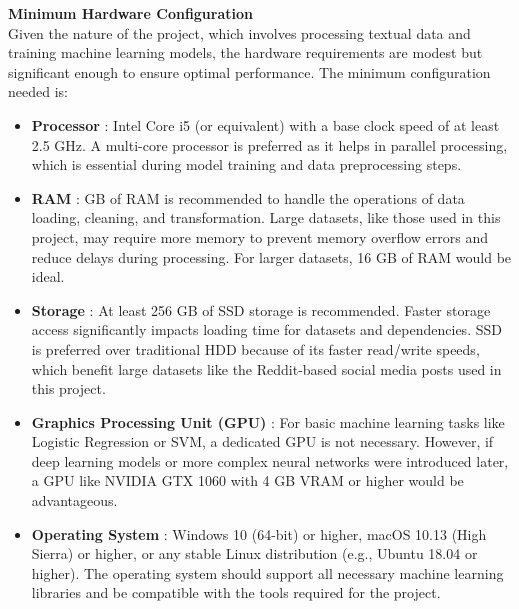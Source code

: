 \noindent
\textbf{Minimum Hardware Configuration} \\
\noindent
Given the nature of the project, which involves processing textual data and training machine learning models, the hardware requirements are modest but significant enough to ensure optimal performance. The minimum configuration needed is:
\begin{itemize}
    \item \textbf{Processor} :
    \noindent
    Intel Core i5 (or equivalent) with a base clock speed of at least 2.5 GHz. A multi-core processor is preferred as it helps in parallel processing, which is essential during model training and data preprocessing steps.
    \item \textbf{RAM} :
     GB of RAM is recommended to handle the operations of data loading, cleaning, and transformation. Large datasets, like those used in this project, may require more memory to prevent memory overflow errors and reduce delays during processing. For larger datasets, 16 GB of RAM would be ideal.
    \item \textbf{Storage} :
    \noindent
    At least 256 GB of SSD storage is recommended. Faster storage access significantly impacts loading time for datasets and dependencies. SSD is preferred over traditional HDD because of its faster read/write speeds, which benefit large datasets like the Reddit-based social media posts used in this project.
    \item \textbf{Graphics Processing Unit (GPU)} :
    \noindent
    For basic machine learning tasks like Logistic Regression or SVM, a dedicated GPU is not necessary. However, if deep learning models or more complex neural networks were introduced later, a GPU like NVIDIA GTX 1060 with 4 GB VRAM or higher would be advantageous.
    \item \textbf{Operating System} :
    \noindent
    Windows 10 (64-bit) or higher, macOS 10.13 (High Sierra) or higher, or any stable Linux distribution (e.g., Ubuntu 18.04 or higher). The operating system should support all necessary machine learning libraries and be compatible with the tools required for the project.
\end{itemize} \\

